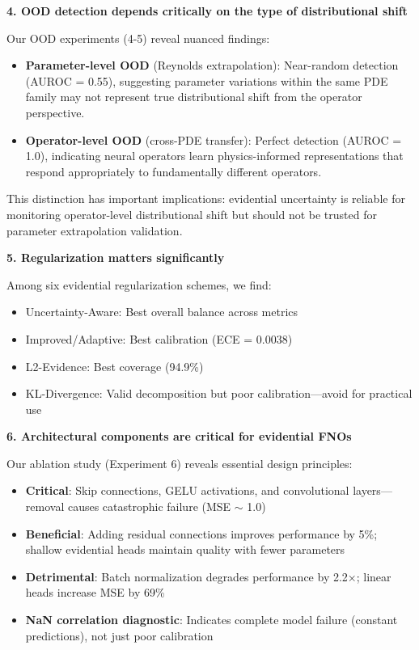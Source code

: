 \textbf{4. OOD detection depends critically on the type of distributional shift}

Our OOD experiments (4-5) reveal nuanced findings:
\begin{itemize}
\item \textbf{Parameter-level OOD} (Reynolds extrapolation): Near-random detection (AUROC = 0.55), suggesting parameter variations within the same PDE family may not represent true distributional shift from the operator perspective.
\item \textbf{Operator-level OOD} (cross-PDE transfer): Perfect detection (AUROC = 1.0), indicating neural operators learn physics-informed representations that respond appropriately to fundamentally different operators.
\end{itemize}

This distinction has important implications: evidential uncertainty is reliable for monitoring operator-level distributional shift but should not be trusted for parameter extrapolation validation.

\textbf{5. Regularization matters significantly}

Among six evidential regularization schemes, we find:
\begin{itemize}
\item Uncertainty-Aware: Best overall balance across metrics
\item Improved/Adaptive: Best calibration (ECE = 0.0038)
\item L2-Evidence: Best coverage (94.9\%)
\item KL-Divergence: Valid decomposition but poor calibration—avoid for practical use
\end{itemize}

\textbf{6. Architectural components are critical for evidential FNOs}

Our ablation study (Experiment 6) reveals essential design principles:
\begin{itemize}
\item \textbf{Critical}: Skip connections, GELU activations, and convolutional layers—removal causes catastrophic failure (MSE $\sim$ 1.0)
\item \textbf{Beneficial}: Adding residual connections improves performance by 5\%; shallow evidential heads maintain quality with fewer parameters
\item \textbf{Detrimental}: Batch normalization degrades performance by 2.2×; linear heads increase MSE by 69\%
\item \textbf{NaN correlation diagnostic}: Indicates complete model failure (constant predictions), not just poor calibration
\end{itemize}


